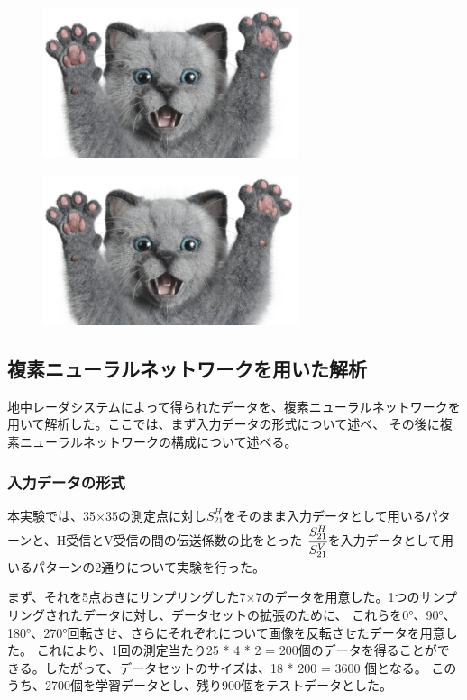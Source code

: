 \documentclass[11pt,a4paper,uplatex]{ujarticle}
\begin{document}
  \begin{figure}[tbp]
    \begin{minipage}[b]{0.5\textwidth}
      \centering
      \includegraphics[keepaspectratio, width=75mm]{Images/sampleneko.png}
      \label{fig:center_offset}
    \end{minipage}
    \begin{minipage}[b]{0.5\textwidth}
      \centering
      \includegraphics[keepaspectratio, width=75mm]{Images/sampleneko.png}
      \label{fig:actual_msr_range}
    \end{minipage}
  \end{figure}


  \subsection{複素ニューラルネットワークを用いた解析}\label{sec:analysis}
  地中レーダシステムによって得られたデータを、複素ニューラルネットワークを用いて解析した。ここでは、まず入力データの形式について述べ、
  その後に複素ニューラルネットワークの構成について述べる。
  \subsubsection{入力データの形式}
  本実験では、35×35の測定点に対し$S_{21}^{H}$をそのまま入力データとして用いるパターンと、H受信とV受信の間の伝送係数の比をとった
  $\cfrac{S_{21}^{H}}{S_{21}^{V}}$を入力データとして用いるパターンの2通りについて実験を行った。

  まず、それを5点おきにサンプリングした7×7のデータを用意した。1つのサンプリングされたデータに対し、データセットの拡張のために、
  これらを0°、90°、180°、270°回転させ、さらにそれぞれについて画像を反転させたデータを用意した。
  これにより、1回の測定当たり25 * 4 * 2 = 200個のデータを得ることができる。したがって、データセットのサイズは、18 * 200 = 3600 個となる。
  このうち、2700個を学習データとし、残り900個をテストデータとした。
\end{document}
